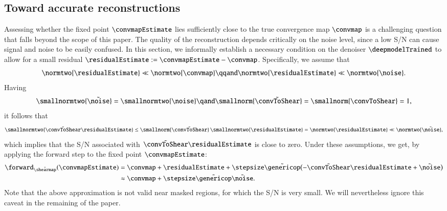 \documentclass{aa}
\begin{document}
\subsection{Toward accurate reconstructions}
\label{subsec:pnp_smallresidual}

Assessing whether the fixed point $\convmapEstimate$ lies sufficiently close to the true convergence map $\convmap$ is a challenging question that falls beyond the scope of this paper. The quality of the reconstruction depends critically on the noise level, since a low S/N can cause signal and noise to be easily confused. In this section, we informally establish a necessary condition on the denoiser $\deepmodelTrained$ to allow for a small residual $\residualEstimate := \convmapEstimate - \convmap$. Specifically, we assume that%
\begin{equation}
    \normtwo{\residualEstimate} \ll \normtwo{\convmap} \qqand \normtwo{\residualEstimate} \ll \normtwo{\noise}.
\label{eq:smallresidual}
\end{equation}
Having
\begin{equation}
    \smallnormtwo{\tilde\noise} = \smallnormtwo{\noise} \qand \smallnorm{\tilde\convToShear} = \smallnorm{\convToShear} = 1,
\end{equation}
it follows that
\begin{equation}
    \smallnormtwo{\tilde\convToShear\residualEstimate} \leq \smallnorm{\tilde\convToShear} \, \smallnormtwo{\residualEstimate} = \normtwo{\residualEstimate} \ll \normtwo{\tilde\noise},
\end{equation}
which implies that the S/N associated with $\tilde\convToShear\residualEstimate$ is close to zero.
Under these assumptions, we get, by applying the forward step to the fixed point $\convmapEstimate$:
\begin{align}
    \forward_{\tilde\shearmap}(\convmapEstimate)
        &= \convmap + \residualEstimate + \stepsize\tilde\genericop\bigl(
            -\tilde\convToShear\residualEstimate + \tilde\noise
        \bigr) \\
        &\approx \convmap + \stepsize\tilde\genericop\tilde\noise.
\label{eq:fixedpointcondition}
\end{align}
Note that the above approximation is not valid near masked regions, for which the S/N is very small. We will nevertheless ignore this caveat in the remaining of the paper.
\end{document}
